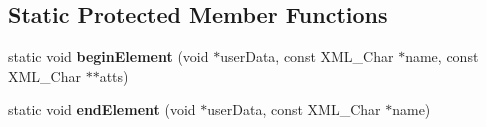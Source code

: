 \subsection*{Static Protected Member Functions}
\begin{DoxyCompactItemize}
\item 
static void {\bfseries begin\+Element} (void $\ast$user\+Data, const X\+M\+L\+\_\+\+Char $\ast$name, const X\+M\+L\+\_\+\+Char $\ast$$\ast$atts)\hypertarget{classCockpit_af0d8b5b428f14e9d5cf61defeeed0e76}{}\label{classCockpit_af0d8b5b428f14e9d5cf61defeeed0e76}

\item 
static void {\bfseries end\+Element} (void $\ast$user\+Data, const X\+M\+L\+\_\+\+Char $\ast$name)\hypertarget{classCockpit_a1f9172d778733568cfde72151053b92b}{}\label{classCockpit_a1f9172d778733568cfde72151053b92b}

\end{DoxyCompactItemize}
